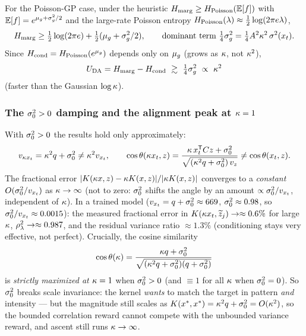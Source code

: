 \begin{proposition}\label{prop:poisson-c2}
For the Poisson-GP case, under the heuristic $H_{\mathrm{marg}}\ge H_{\mathrm{Poisson}}(\mathbb{E}[f])$ with
$\mathbb{E}[f]=e^{\mu_{g}+\sigma_{g}^{2}/2}$ and the large-rate Poisson entropy
$H_{\mathrm{Poisson}}(\lambda)\approx\tfrac12\log(2\pi e\lambda)$,
\[
  H_{\mathrm{marg}}\ge\tfrac12\log(2\pi e)+\tfrac12(\mu_{g}+\sigma_{g}^{2}/2),
  \qquad\text{dominant term }\tfrac14\sigma_{g}^{2}=\tfrac14A^2\kappa^2\,\sigma^{2}(x_t).
\]
Since $H_{\mathrm{cond}}=H_{\mathrm{Poisson}}(e^{\mu_{g}})$ depends only on $\mu_{g}$ (grows as $\kappa$, not
$\kappa^2$),
\[
  U_{\mathrm{DA}}=H_{\mathrm{marg}}-H_{\mathrm{cond}}\ \gtrsim\ \tfrac14\sigma_{g}^{2}\ \propto\ \kappa^2
\]
(faster than the Gaussian $\log\kappa$).
\end{proposition}

\subsubsection{The $\sigma_{0}^2>0$ damping and the alignment peak at $\kappa=1$}
With $\sigma_{0}^2>0$ the results hold only approximately:
\[
  v_{\kappa x_t}=\kappa^2 q+\sigma_{0}^2\neq\kappa^2v_{x_t},\qquad
  \cos\theta(\kappa x_t,z)=\frac{\kappa\,x_t^{\mathsf{T}}C z+\sigma_{0}^2}{\sqrt{(\kappa^2 q+\sigma_{0}^2)\,v_z}}\neq\cos\theta(x_t,z).
\]
The fractional error $|K(\kappa x,z)-\kappa K(x,z)|/|\kappa K(x,z)|$ converges to a
\emph{constant} $O(\sigma_{0}^2/v_{x_t})$ as $\kappa\to\infty$ (not to zero: $\sigma_{0}^2$
shifts the angle by an amount $\propto\sigma_{0}^2/v_{x_t}$, independent of $\kappa$).
In a trained model ($v_{x_t}=q+\sigma_{0}^2\approx669$, $\sigma_{0}^2\approx0.98$, so
$\sigma_{0}^2/v_{x_t}\approx0.0015$): the measured fractional error in
$K(\kappa x_t,\widetilde{z}_j)\to\approx0.6\%$ for large $\kappa$, $\rho_{\lambda}^2\to\approx0.987$,
and the residual variance ratio $\approx1.3\%$ (conditioning stays very effective,
not perfect). Crucially, the cosine similarity
\[
  \cos\theta(\kappa)=\frac{\kappa q+\sigma_{0}^2}{\sqrt{(\kappa^2 q+\sigma_{0}^2)(q+\sigma_{0}^2)}}
\]
is \emph{strictly maximized at $\kappa=1$} when $\sigma_{0}^2>0$ (and $\equiv1$ for all
$\kappa$ when $\sigma_{0}^2=0$). So $\sigma_{0}^2$ breaks scale invariance: the kernel
\emph{wants} to match the target in pattern \emph{and} intensity --- but the
magnitude still scales as $K(x^*,x^*)=\kappa^2 q+\sigma_{0}^2=O(\kappa^2)$, so the
bounded correlation reward cannot compete with the unbounded variance reward, and
ascent still runs $\kappa\to\infty$.

